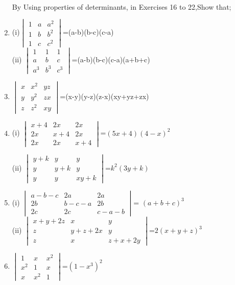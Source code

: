 \begin{enumerate}[label=\arabic*.,ref=\thesubsection.\theenumi]
\\
\solution 

By Using properties of determinants, in Exercises 16 to 22,Show that;
\item (i)$\begin{vmatrix}1&a&a^2\\1&b&b^2\\1&c&c^2\end{vmatrix}$=(a-b)(b-c)(c-a)\\
(ii) $\begin{vmatrix}1&1&1 \\ a&b&c \\ a^3&b^3&c^3\end{vmatrix}$=(a-b)(b-c)(c-a)(a+b+c)
\\
\solution 

\item $\begin{vmatrix}x&x^2&yz \\ y&y^2&zx \\ z&z^2&xy\end{vmatrix}$=(x-y)(y-z)(z-x)(xy+yz+zx)
\item (i) $\begin{vmatrix}x+4&2x&2x \\ 2x&x+4&2x \\ 2x&2x&x+4\end{vmatrix}$=$(5x+4)(4-x)^2$\\
\solution 

(ii) $\begin{vmatrix}y+k&y&y \\ y&y+k&y \\ y&y&xy+k\end{vmatrix}$=$k^2(3y+k)$
\\
\solution 

\item (i) $\begin{vmatrix}a-b-c& 2a& 2a \\ 2b& b-c-a& 2b \\ 2c& 2c& c-a-b\end{vmatrix}$= $(a+b+c)^3$\\
(ii) $\begin{vmatrix}x+y+2z&x&y \\ z&y+z+2x&y \\ z&x&z+x+2y\end{vmatrix}$=$2(x+y+z)^3$
\item $\begin{vmatrix}1&x&x^2 \\ x^2&1&x \\ x&x^2&1\end{vmatrix}$=$(1-x^3)^2$ 

\end{enumerate}
